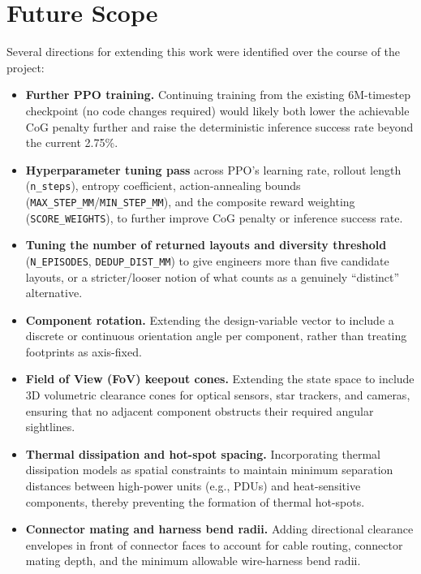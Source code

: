 \documentclass[11pt,a4paper,oneside]{report}
\begin{document}
\chapter{Future Scope}
\label{chap:future}
Several directions for extending this work were identified over the course of the project:
\begin{itemize}
    \item \textbf{Further PPO training.} Continuing training from the existing 6M-timestep checkpoint (no code changes required) would likely both lower the achievable CoG penalty further and raise the deterministic inference success rate beyond the current 2.75\%.
    
    \item \textbf{Hyperparameter tuning pass} across PPO's learning rate, rollout length (\texttt{n\_steps}), entropy coefficient, action-annealing bounds (\texttt{MAX\_STEP\_MM}/\texttt{MIN\_STEP\_MM}), and the composite reward weighting (\texttt{SCORE\_WEIGHTS}), to further improve CoG penalty or inference success rate.
    
    \item \textbf{Tuning the number of returned layouts and diversity threshold} (\texttt{N\_EPISODES}, \texttt{DEDUP\_DIST\_MM}) to give engineers more than five candidate layouts, or a stricter/looser notion of what counts as a genuinely ``distinct'' alternative.
    
    \item \textbf{Component rotation.} Extending the design-variable vector to include a discrete or continuous orientation angle per component, rather than treating footprints as axis-fixed.
    
    \item \textbf{Field of View (FoV) keepout cones.} Extending the state space to include 3D volumetric clearance cones for optical sensors, star trackers, and cameras, ensuring that no adjacent component obstructs their required angular sightlines.
    
    \item \textbf{Thermal dissipation and hot-spot spacing.} Incorporating thermal dissipation models as spatial constraints to maintain minimum separation distances between high-power units (e.g., PDUs) and heat-sensitive components, thereby preventing the formation of thermal hot-spots.
    
    \item \textbf{Connector mating and harness bend radii.} Adding directional clearance envelopes in front of connector faces to account for cable routing, connector mating depth, and the minimum allowable wire-harness bend radii.
    

\end{itemize}
\end{document}
